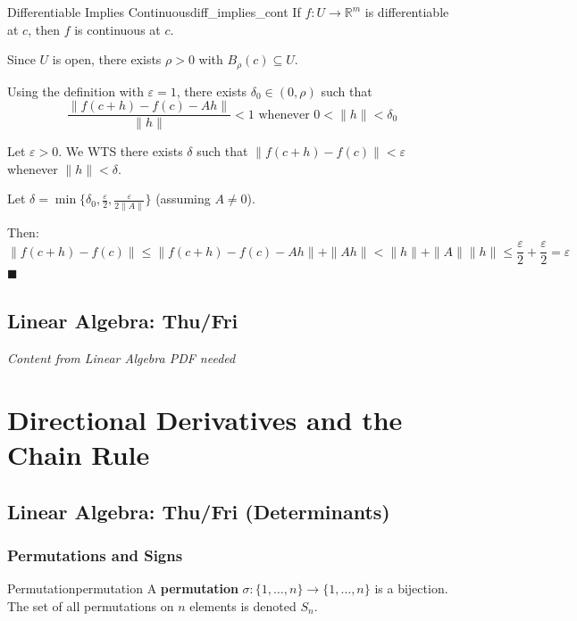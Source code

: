 \documentclass[11pt, letterpaper, openany]{book}
\renewenvironment{proof}[1][\proofname]{%
  \tcolorbox[blanker, breakable, left=1em,
    before skip=1em, after skip=1em,
    borderline west={2pt}{0pt}{MagicTeal!50},
    colback=MagicCream,
    before upper={\textcolor{MagicTeal}{\sffamily\bfseries #1.}\space}
  ]%
}{%
  \hfill\textcolor{MagicTeal}{\ensuremath{\blacksquare}}\endtcolorbox%
}
\begin{document}
\begin{thm}{Differentiable Implies Continuous}{diff_implies_cont}
If $f: U \to \mathbb{R}^m$ is differentiable at $c$, then $f$ is continuous at $c$.
\end{thm}

\begin{proof}
Since $U$ is open, there exists $\rho > 0$ with $B_\rho(c) \subseteq U$.

Using the definition with $\varepsilon = 1$, there exists $\delta_0 \in (0, \rho)$ such that
\[\frac{\|f(c+h) - f(c) - Ah\|}{\|h\|} < 1 \text{ whenever } 0 < \|h\| < \delta_0\]

Let $\varepsilon > 0$. We WTS there exists $\delta$ such that $\|f(c+h) - f(c)\| < \varepsilon$ whenever $\|h\| < \delta$.

Let $\delta = \min\{\delta_0, \frac{\varepsilon}{2}, \frac{\varepsilon}{2\|A\|}\}$ (assuming $A \neq 0$).

Then:
\[\|f(c+h) - f(c)\| \leq \|f(c+h) - f(c) - Ah\| + \|Ah\| < \|h\| + \|A\|\|h\| \leq \frac{\varepsilon}{2} + \frac{\varepsilon}{2} = \varepsilon\]
\end{proof}

\section{Linear Algebra: Thu/Fri}
\begin{center}
    \textit{Content from Linear Algebra PDF needed}
\end{center}


\chapter{Directional Derivatives and the Chain Rule}

\section{Linear Algebra: Thu/Fri (Determinants)}

\subsection{Permutations and Signs}

\begin{defn}{Permutation}{permutation}
A \textbf{permutation} $\sigma: \{1, \ldots, n\} \to \{1, \ldots, n\}$ is a bijection. The set of all permutations on $n$ elements is denoted $S_n$.
\end{defn}
\end{document}
